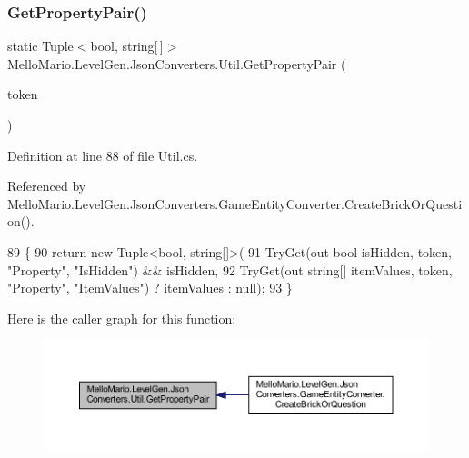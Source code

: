 \mbox{\label{classMelloMario_1_1LevelGen_1_1JsonConverters_1_1Util_a83538353f1cb1387fde4f89b5669df7d}} 
\subsubsection{Get\+Property\+Pair()}
{\footnotesize\ttfamily static Tuple$<$bool, string[$\,$]$>$ Mello\+Mario.\+Level\+Gen.\+Json\+Converters.\+Util.\+Get\+Property\+Pair (\begin{DoxyParamCaption}\item[{J\+Token}]{token }\end{DoxyParamCaption})\hspace{0.3cm}{\ttfamily [static]}}



Definition at line 88 of file Util.\+cs.



Referenced by Mello\+Mario.\+Level\+Gen.\+Json\+Converters.\+Game\+Entity\+Converter.\+Create\+Brick\+Or\+Question().


\begin{DoxyCode}
89         \{
90             \textcolor{keywordflow}{return} \textcolor{keyword}{new} Tuple<bool, string[]>(
91                 TryGet(out \textcolor{keywordtype}{bool} isHidden, token, \textcolor{stringliteral}{"Property"}, \textcolor{stringliteral}{"IsHidden"}) && isHidden,
92                 TryGet(out \textcolor{keywordtype}{string}[] itemValues, token, \textcolor{stringliteral}{"Property"}, \textcolor{stringliteral}{"ItemValues"}) ? itemValues : null);
93         \}
\end{DoxyCode}
Here is the caller graph for this function\+:
\nopagebreak
\begin{figure}[H]
\begin{center}
\leavevmode
\includegraphics[width=350pt]{classMelloMario_1_1LevelGen_1_1JsonConverters_1_1Util_a83538353f1cb1387fde4f89b5669df7d_icgraph}
\end{center}
\end{figure}
\mbox{\label{classMelloMario_1_1LevelGen_1_1JsonConverters_1_1Util_a0e01902dfeb87365042a42976521384e}} 
